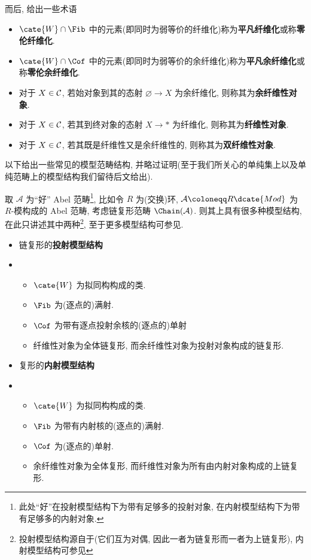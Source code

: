 而后, 给出一些术语
\begin{definition}[术语]
    \begin{itemize}
        \item $\cate{W}\cap \Fib$ 中的元素(即同时为弱等价的纤维化)称为\textbf{平凡纤维化}或称\textbf{零伦纤维化}.
        \item $\cate{W}\cap \Cof$ 中的元素(即同时为弱等价的余纤维化)称为\textbf{平凡余纤维化}或称\textbf{零伦余纤维化}.
        \item 对于 $X\in \cal{C}$, 若始对象到其的态射 $\varnothing \to X$ 为余纤维化, 则称其为\textbf{余纤维性对象}.
        \item 对于 $X\in \cal{C}$, 若其到终对象的态射 $X \to *$ 为纤维化, 则称其为\textbf{纤维性对象}.
        \item 对于 $X\in \cal{C}$, 若其既是纤维性又是余纤维性的, 则称其为\textbf{双纤维性对象}.
    \end{itemize}
\end{definition}
以下给出一些常见的模型范畴结构, 并略过证明(至于我们所关心的单纯集上以及单纯范畴上的模型结构我们留待后文给出).
\begin{example}[常见的模型范畴]\label{例:常见模型结构}
取 $\mathcal{A}$ 为``好'' Abel 范畴\footnote{此处``好''在投射模型结构下为带有足够多的投射对象, 在内射模型结构下为带有足够多的内射对象.}, 比如令 $R$ 为(交换)环, $\mathcal{A} \coloneqq R\dcate{Mod}$ 为 $R$-模构成的 Abel 范畴, 考虑链复形范畴 $\Chain(\cal{A})$. 则其上具有很多种模型结构, 在此只讲述其中两种\footnote{投射模型结构源自于\cite[2.4 最后 Remark 的 item 5]{quillen2006homotopical}(它们互为对偶, 因此一者为链复形而一者为上链复形), 内射模型结构可参见\cite[Theorem 2.4.5.而证明见 2.5]{dungan2010review}}, 至于更多模型结构可参见\cite[\href{https://ncatlab.org/nlab/show/model+structure+on+chain+complexes}{model structure on chain complexes}]{nlab:homepage}.
    \begin{itemize}
        \item[]链复形的\textbf{投射模型结构}
        \item[]
        \begin{itemize}
            \item $\cate{W}$ 为拟同构构成的类.
            \item $\Fib$ 为(逐点的)满射.
            \item $\Cof$ 为带有逐点投射余核的(逐点的)单射
            \item 纤维性对象为全体链复形, 而余纤维性对象为投射对象构成的链复形.
        \end{itemize}
        \item[]复形的\textbf{内射模型结构}
        \item[]
        \begin{itemize}
            \item $\cate{W}$ 为拟同构构成的类.
            \item $\Fib$ 为带有内射核的(逐点的)满射.
            \item $\Cof$ 为(逐点的)单射.
            \item 余纤维性对象为全体复形, 而纤维性对象为所有由内射对象构成的上链复形.
        \end{itemize}
    \end{itemize}
\end{example}
